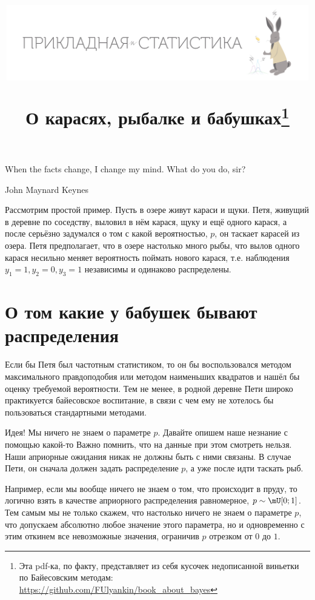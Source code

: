 \documentclass[12pt, a4paper, oneside]{article}
\title{\begin{center} \includegraphics[width=0.99\textwidth]{logo.png} \end{center}  О карасях, рыбалке и бабушках\footnote{Эта pdf-ка, по факту, представляет из себя кусочек недописанной виньетки по Байесовским методам: \newline  \url{https://github.com/FUlyankin/book_about_bayes}}}
\date{ } %
\begin{document}
\maketitle

\epigraph{When the facts change, I change my mind. What do you do, sir?}{John Maynard Keynes}

Рассмотрим простой пример. Пусть в озере живут караси и щуки. Петя, живущий в деревне по соседству, выловил в нём карася, щуку и ещё одного карася, а после серьёзно задумался о том с какой вероятностью, $p$, он таскает карасей из озера. Петя предполагает, что в озере настолько много рыбы, что вылов одного карася несильно меняет вероятность поймать нового карася, т.е. наблюдения $y_1 = 1, y_2 = 0, y_3 = 1$ независимы и одинаково распределены.

\section*{О том какие у бабушек бывают распределения}

Если бы Петя был частотным статистиком, то он бы воспользовался методом максимального правдоподобия или методом наименьших квадратов и нашёл бы оценку требуемой вероятности. Тем не менее, в родной деревне Пети широко практикуется байесовское воспитание, в связи с чем ему не хотелось бы пользоваться стандартными методами.

Идея! Мы ничего не знаем о параметре $p$. Давайте опишем наше незнание с помощью какой-то  Важно  помнить, что на данные при этом смотреть нельзя. Наши априорные ожидания никак не должны быть с ними связаны. В случае Пети, он сначала должен задать распределение $p$, а уже после идти таскать рыб.

Например, если мы вообще ничего не знаем о том, что происходит в пруду, то логично взять в качестве априорного распределения равномерное, $p \sim \mU[0;1]$. Тем самым мы не только скажем, что настолько ничего не знаем о параметре $p$, что допускаем абсолютно любое значение этого параметра, но и одновременно с этим откинем все невозможные значения, ограничив $p$ отрезком от $0$ до $1$.
\end{document}
